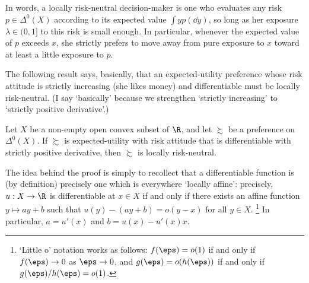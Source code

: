 In words, a locally risk-neutral decision-maker is one who evaluates any risk $p \in \Delta^0(X)$ according to its expected value $\int y p(\dd y)$, so long as her exposure $\lambda \in (0,1]$ to this risk is small enough. In particular, whenever the expected value of $p$ exceeds $x$, she strictly prefers to move away from pure exposure to $x$ toward at least a little exposure to $p$.

The following result says, basically, that an expected-utility preference whose risk attitude is strictly increasing (she likes money) and differentiable must be locally risk-neutral. (I say `basically' because we strengthen `strictly increasing' to `strictly positive derivative'.)

\begin{proposition}
	\label{proposition:local_rn}
	Let $X$ be a non-empty open convex subset of $\R$, and let $\succsim$ be a preference on $\Delta^0(X)$. If $\succsim$ is expected-utility with risk attitude that is differentiable with strictly positive derivative, then $\succsim$ is locally risk-neutral.
\end{proposition}

The idea behind the proof is simply to recollect that a differentiable function is (by definition) precisely one which is everywhere `locally affine': precisely, $u : X \to \R$ is differentiable at $x \in X$ if and only if there exists an affine function $y \mapsto ay+b$ such that $u(y) - (ay+b) = o(y-x)$ for all $y \in X$.%
	\footnote{`Little o' notation works as follows: $f(\eps)=o(1)$ if and only if $f(\eps) \to 0$ as $\eps \to 0$, and $g(\eps)=o(h(\eps))$ if and only if $g(\eps)/h(\eps) = o(1)$.}
In particular, $a=u'(x)$ and $b=u(x)-u'(x)x$.

